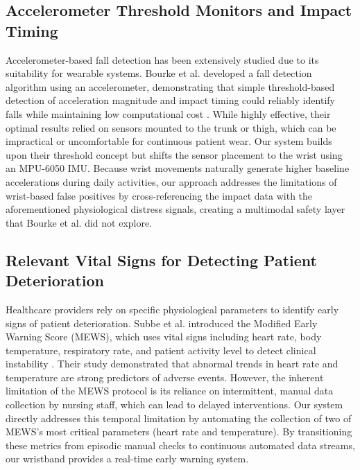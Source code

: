 \documentclass[conference]{IEEEtran}
\begin{document}
\subsection{Accelerometer Threshold Monitors and Impact Timing}
Accelerometer-based fall detection has been extensively studied due to its suitability for wearable systems. Bourke et al. developed a fall detection algorithm using an accelerometer, demonstrating that simple threshold-based detection of acceleration magnitude and impact timing could reliably identify falls while maintaining low computational cost \cite{bourke2007}. While highly effective, their optimal results relied on sensors mounted to the trunk or thigh, which can be impractical or uncomfortable for continuous patient wear. Our system builds upon their threshold concept but shifts the sensor placement to the wrist using an MPU-6050 IMU. Because wrist movements naturally generate higher baseline accelerations during daily activities, our approach addresses the limitations of wrist-based false positives by cross-referencing the impact data with the aforementioned physiological distress signals, creating a multimodal safety layer that Bourke et al. did not explore.

\subsection{Relevant Vital Signs for Detecting Patient Deterioration}
Healthcare providers rely on specific physiological parameters to identify early signs of patient deterioration. Subbe et al. introduced the Modified Early Warning Score (MEWS), which uses vital signs including heart rate, body temperature, respiratory rate, and patient activity level to detect clinical instability \cite{subbe2001}. Their study demonstrated that abnormal trends in heart rate and temperature are strong predictors of adverse events. However, the inherent limitation of the MEWS protocol is its reliance on intermittent, manual data collection by nursing staff, which can lead to delayed interventions. Our system directly addresses this temporal limitation by automating the collection of two of MEWS's most critical parameters (heart rate and temperature). By transitioning these metrics from episodic manual checks to continuous automated data streams, our wristband provides a real-time early warning system.
\end{document}
